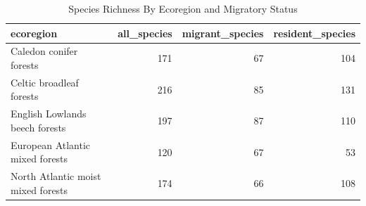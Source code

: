 \begin{table}[ht]
\centering
\begin{tabular}{lrrr}
  \toprule
ecoregion & all\_species & migrant\_species & resident\_species \\ 
  \midrule
Caledon conifer forests & 171 & 67 & 104 \\ 
  Celtic broadleaf forests & 216 & 85 & 131 \\ 
  English Lowlands beech forests & 197 & 87 & 110 \\ 
  European Atlantic mixed forests & 120 & 67 & 53 \\ 
  North Atlantic moist mixed forests & 174 & 66 & 108 \\ 
   \bottomrule
\end{tabular}
\caption{Species Richness By Ecoregion and Migratory Status} 
\label{tab:sr_checks_binary_yearly}
\end{table}
